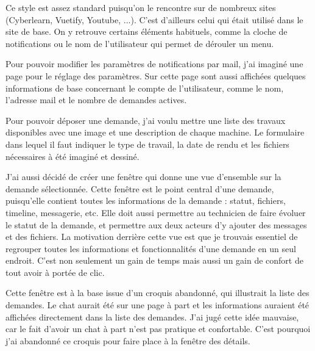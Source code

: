 \documentclass[
    iai, %
    eai, %
]{heig-tb}
\begin{document}

Ce style est assez standard puisqu'on le rencontre sur de nombreux sites (Cyberlearn, Vuetify, Youtube, ...).
C'est d'ailleurs celui qui était utilisé dans le site de base.
On y retrouve certains éléments habituels, comme la cloche de notifications ou le nom de l'utilisateur qui permet de dérouler un menu.

Pour pouvoir modifier les paramètres de notifications par mail, j'ai imaginé une page pour le réglage des paramètres.
Sur cette page sont aussi affichées quelques informations de base concernant le compte de l'utilisateur, comme le nom, l'adresse mail et le nombre de demandes actives.

Pour pouvoir déposer une demande, j'ai voulu mettre une liste des travaux disponibles avec une image et une description de chaque machine.
Le formulaire dans lequel il faut indiquer le type de travail, la date de rendu et les fichiers nécessaires à été imaginé et dessiné.

\newpage
{}

J'ai aussi décidé de créer une fenêtre qui donne une vue d'ensemble sur la demande sélectionnée.
Cette fenêtre est le point central d'une demande, puisqu'elle contient toutes les informations de la demande : statut, fichiers, timeline, messagerie, etc.
Elle doit aussi permettre au technicien de faire évoluer le statut de la demande, et permettre aux deux acteurs d'y ajouter des messages et des fichiers.
La motivation derrière cette vue est que je trouvais essentiel de regrouper toutes les informations et fonctionnalités d'une demande en un seul endroit. C'est non seulement un gain de temps mais aussi un gain de confort de tout avoir à portée de clic.

\newpage
{}

Cette fenêtre est à la base issue d'un croquis abandonné, qui illustrait la liste des demandes. Le chat aurait été sur une page à part et les informations auraient été affichées directement dans la liste des demandes. J'ai jugé cette idée mauvaise, car le fait d'avoir un chat à part n'est pas pratique et confortable. C'est pourquoi j'ai abandonné ce croquis pour faire place à la fenêtre des détails.

\end{document}
